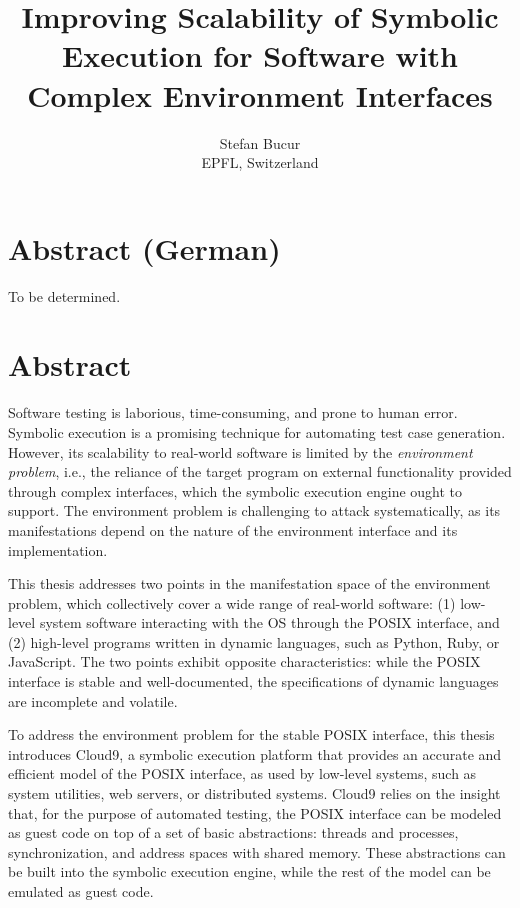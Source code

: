 \documentclass[letterpaper,10pt,oneside]{book}
\newcommand{\thesistitle}{Improving Scalability of Symbolic Execution for Software with Complex Environment Interfaces}
\begin{document}
\date{}
\title{\thesistitle}
\author{Stefan Bucur \\ EPFL, Switzerland}

\maketitle

\chapter*{Abstract (German)}

To be determined.

\chapter*{Abstract}

Software testing is laborious, time-consuming, and prone to human error.  Symbolic execution is a promising technique for automating test case generation.  However, its scalability to real-world software is limited by the \emph{environment problem}, i.e., the reliance of the target program on external functionality provided through complex interfaces, which the symbolic execution engine ought to support.
%
The environment problem is challenging to attack systematically, as its manifestations depend on the nature of the environment interface and its implementation.

This thesis addresses two points in the manifestation space of the environment problem, which collectively cover a wide range of real-world software: (1) low-level system software interacting with the OS through the POSIX interface, and (2) high-level programs written in dynamic languages, such as Python, Ruby, or JavaScript.  The two points exhibit opposite characteristics: while the POSIX interface is stable and well-documented, the specifications of dynamic languages are incomplete and volatile.

To address the environment problem for the stable POSIX interface, this thesis introduces Cloud9, a symbolic execution platform that provides an accurate and efficient model of the POSIX interface, as used by low-level systems, such as system utilities, web servers, or distributed systems.
%
Cloud9 relies on the insight that, for the purpose of automated testing, the POSIX interface can be modeled as guest code on top of a set of basic abstractions: threads and processes, synchronization, and address spaces with shared memory. These abstractions can be built into the symbolic execution engine, while the rest of the model can be emulated as guest code.
\end{document}
